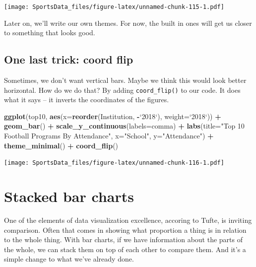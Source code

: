\documentclass[]{book}
\newenvironment{Shaded}{\begin{snugshade}}{\end{snugshade}}
\newcommand{\KeywordTok}[1]{\textcolor[rgb]{0.13,0.29,0.53}{\textbf{#1}}}
\newcommand{\DataTypeTok}[1]{\textcolor[rgb]{0.13,0.29,0.53}{#1}}
\newcommand{\StringTok}[1]{\textcolor[rgb]{0.31,0.60,0.02}{#1}}
\newcommand{\OperatorTok}[1]{\textcolor[rgb]{0.81,0.36,0.00}{\textbf{#1}}}
\newcommand{\NormalTok}[1]{#1}
\begin{document}
\texttt{[image: SportsData\_files/figure-latex/unnamed-chunk-115-1.pdf]}

Later on, we'll write our own themes. For now, the built in ones will
get us closer to something that looks good.

\section{One last trick: coord flip}\label{one-last-trick-coord-flip}

Sometimes, we don't want vertical bars. Maybe we think this would look
better horizontal. How do we do that? By adding \texttt{coord\_flip()}
to our code. It does what it says -- it inverts the coordinates of the
figures.

\begin{Shaded}
\begin{Highlighting}[]
\KeywordTok{ggplot}\NormalTok{(top10, }\KeywordTok{aes}\NormalTok{(}\DataTypeTok{x=}\KeywordTok{reorder}\NormalTok{(Institution, }\OperatorTok{-}\StringTok{`}\DataTypeTok{2018}\StringTok{`}\NormalTok{), }\DataTypeTok{weight=}\StringTok{`}\DataTypeTok{2018}\StringTok{`}\NormalTok{)) }\OperatorTok{+}\StringTok{ }\KeywordTok{geom_bar}\NormalTok{() }\OperatorTok{+}\StringTok{ }\KeywordTok{scale_y_continuous}\NormalTok{(}\DataTypeTok{labels=}\NormalTok{comma) }\OperatorTok{+}\StringTok{ }\KeywordTok{labs}\NormalTok{(}\DataTypeTok{title=}\StringTok{"Top 10 Football Programs By Attendance"}\NormalTok{, }\DataTypeTok{x=}\StringTok{"School"}\NormalTok{, }\DataTypeTok{y=}\StringTok{"Attendance"}\NormalTok{) }\OperatorTok{+}\StringTok{ }\KeywordTok{theme_minimal}\NormalTok{() }\OperatorTok{+}\StringTok{ }\KeywordTok{coord_flip}\NormalTok{()}
\end{Highlighting}
\end{Shaded}

\texttt{[image: SportsData\_files/figure-latex/unnamed-chunk-116-1.pdf]}

\chapter{Stacked bar charts}\label{stacked-bar-charts}

One of the elements of data visualization excellence, accoring to Tufte,
is inviting comparison. Often that comes in showing what proportion a
thing is in relation to the whole thing. With bar charts, if we have
information about the parts of the whole, we can stack them on top of
each other to compare them. And it's a simple change to what we've
already done.
\end{document}
